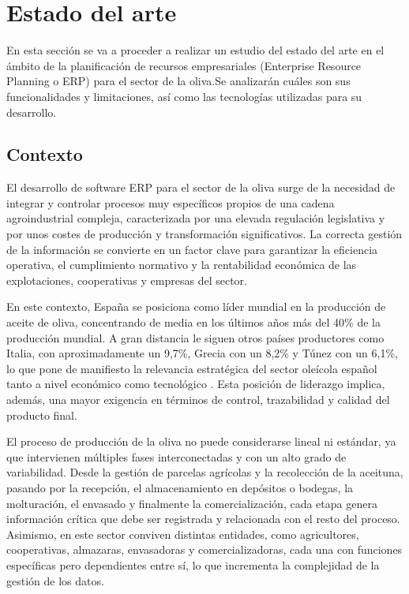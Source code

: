 \chapter{Estado del arte}\label{cap:estado}

En esta sección se va a proceder a realizar un estudio del estado del arte en el ámbito de la planificación de 
recursos empresariales (Enterprise Resource Planning o ERP) para el sector de la oliva.Se analizarán cuáles 
son sus funcionalidades y limitaciones, así como las tecnologías utilizadas para su desarrollo.

\section{Contexto}

El desarrollo de software ERP para el sector de la oliva surge de la necesidad de integrar y controlar procesos 
muy específicos propios de una cadena agroindustrial compleja, caracterizada por una elevada regulación legislativa 
y por unos costes de producción y transformación significativos. La correcta gestión de la información se convierte 
en un factor clave para garantizar la eficiencia operativa, el cumplimiento normativo y la rentabilidad económica de 
las explotaciones, cooperativas y empresas del sector.

En este contexto, España se posiciona como líder mundial en la producción de aceite de oliva, concentrando de media en 
los últimos años más del 40\% de la producción mundial. A gran distancia le siguen otros países productores como Italia, 
con aproximadamente un 9,7\%, Grecia con un 8,2\% y Túnez con un 6,1\%, lo que pone de manifiesto la relevancia 
estratégica del sector oleícola español tanto a nivel económico como tecnológico \cite{principalesProductoresAceiteOliva}.
Esta posición de liderazgo implica, además, una mayor exigencia en términos de control, trazabilidad y calidad del 
producto final.

El proceso de producción de la oliva no puede considerarse lineal ni estándar, ya que intervienen múltiples fases 
interconectadas y con un alto grado de variabilidad. Desde la gestión de parcelas agrícolas y la recolección de la 
aceituna, pasando por la recepción, el almacenamiento en depósitos o bodegas, la molturación, el envasado y finalmente 
la comercialización, cada etapa genera información crítica que debe ser registrada y relacionada con el resto del 
proceso. Asimismo, en este sector conviven distintas entidades, como agricultores, cooperativas, almazaras, envasadoras
y comercializadoras, cada una con funciones específicas pero dependientes entre sí, lo que incrementa la complejidad de 
la gestión de los datos.


